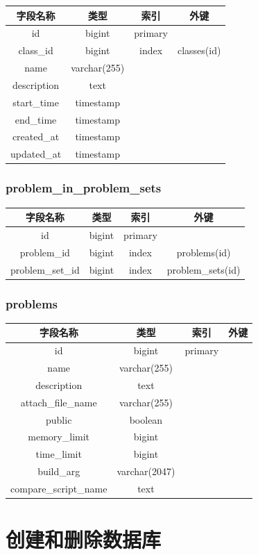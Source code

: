 \documentclass{ctexrep}
\begin{document}
\begin{longtable}[]{@{}cccc@{}}
\toprule
字段名称 & 类型 & 索引 & 外键\tabularnewline
\midrule
id & bigint & primary &\tabularnewline
class_id & bigint & index & classes(id)\tabularnewline
name & varchar(255) & &\tabularnewline
description & text & &\tabularnewline
start_time & timestamp & &\tabularnewline
end_time & timestamp & &\tabularnewline
created_at & timestamp & &\tabularnewline
updated_at & timestamp & &\tabularnewline
\bottomrule
\end{longtable}


\subsection{problem_in_problem_sets}



\begin{longtable}[]{@{}cccc@{}}
\toprule
字段名称 & 类型 & 索引 & 外键\tabularnewline
\midrule
id & bigint & primary &\tabularnewline
problem_id & bigint & index & problems(id)\tabularnewline
problem_set_id & bigint & index & problem_sets(id)\tabularnewline
\bottomrule
\end{longtable}

\subsection{problems}



\begin{longtable}[]{@{}cccc@{}}
\toprule
字段名称 & 类型 & 索引 & 外键\tabularnewline
\midrule
id & bigint & primary &\tabularnewline
name & varchar(255) & &\tabularnewline
description & text & &\tabularnewline
attach_file_name & varchar(255) & &\tabularnewline
public & boolean & &\tabularnewline
memory_limit & bigint & &\tabularnewline
time_limit & bigint & &\tabularnewline
build_arg & varchar(2047) & &\tabularnewline
compare_script_name & text & &\tabularnewline
\bottomrule
\end{longtable}




\chapter{创建和删除数据库}
\newcommand{\pgdb}{postgres}
\end{document}
